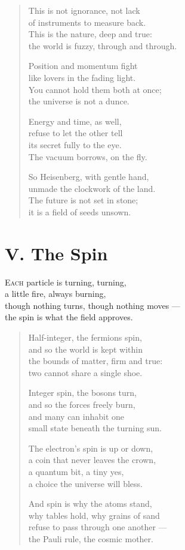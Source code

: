 \documentclass[11pt]{book}
\begin{document}
\begin{verse}
This is not ignorance, not lack\\
of instruments to measure back.\\
This is the nature, deep and true:\\
the world is fuzzy, through and through.

Position and momentum fight\\
like lovers in the fading light.\\
You cannot hold them both at once;\\
the universe is not a dunce.

Energy and time, as well,\\
refuse to let the other tell\\
its secret fully to the eye.\\
The vacuum borrows, on the fly.

So Heisenberg, with gentle hand,\\
unmade the clockwork of the land.\\
The future is not set in stone;\\
it is a field of seeds unsown.
\end{verse}

\section*{V. The Spin}
\lettrine{E}{ach} particle is turning, turning,\\
a little fire, always burning,\\
though nothing turns, though nothing moves ---\\
the spin is what the field approves.

\begin{verse}
Half-integer, the fermions spin,\\
and so the world is kept within\\
the bounds of matter, firm and true:\\
two cannot share a single shoe.

Integer spin, the bosons turn,\\
and so the forces freely burn,\\
and many can inhabit one\\
small state beneath the turning sun.

The electron's spin is up or down,\\
a coin that never leaves the crown,\\
a quantum bit, a tiny yes,\\
a choice the universe will bless.

And spin is why the atoms stand,\\
why tables hold, why grains of sand\\
refuse to pass through one another ---\\
the Pauli rule, the cosmic mother.
\end{verse}
\end{document}
